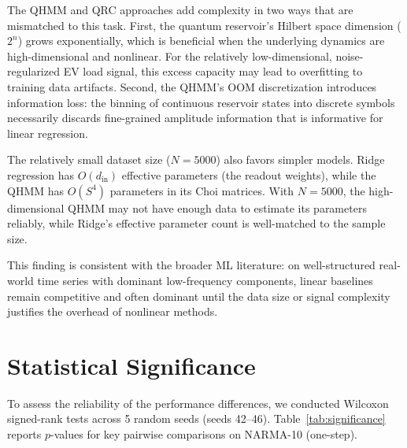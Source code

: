 The QHMM and QRC approaches add complexity in two ways that are
mismatched to this task. First, the quantum reservoir's Hilbert space
dimension ($2^n$) grows exponentially, which is beneficial when the
underlying dynamics are high-dimensional and nonlinear. For the relatively
low-dimensional, noise-regularized EV load signal, this excess capacity
may lead to overfitting to training data artifacts. Second, the QHMM's
OOM discretization introduces information loss: the binning of continuous
reservoir states into discrete symbols necessarily discards fine-grained
amplitude information that is informative for linear regression.



The relatively small dataset size ($N=5000$) also favors simpler models.
Ridge regression has $O(d_{\mathrm{in}})$ effective parameters (the readout
weights), while the QHMM has $O(S^4)$ parameters in its Choi matrices.
With $N=5000$, the high-dimensional QHMM may not have enough data to
estimate its parameters reliably, while Ridge's effective parameter count
is well-matched to the sample size.



This finding is consistent with the broader ML literature: on well-structured
real-world time series with dominant low-frequency components, linear
baselines remain competitive and often dominant until the data size or
signal complexity justifies the overhead of nonlinear methods.



\section{Statistical Significance}
\label{sec:statistical_significance}


To assess the reliability of the performance differences, we conducted
Wilcoxon signed-rank tests across 5 random seeds (seeds 42–46).
Table~\ref{tab:significance} reports $p$-values for key pairwise
comparisons on NARMA-10 (one-step).

